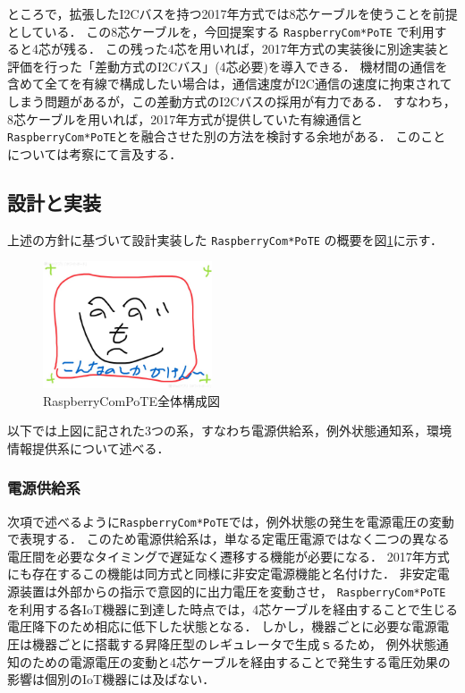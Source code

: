 ところで，拡張したI2Cバスを持つ2017年方式では8芯ケーブルを使うことを前提としている．
この8芯ケーブルを，今回提案する {\tt Raspberry\-Com*PoTE} で利用すると4芯が残る．
この残った4芯を用いれば，2017年方式の実装後に別途実装と評価を行った「差動方式のI2Cバス」(4芯必要)を導入できる．
機材間の通信を含めて全てを有線で構成したい場合は，通信速度がI2C通信の速度に拘束されてしまう問題があるが，この差動方式のI2Cバスの採用が有力である．
すなわち，8芯ケーブルを用いれば，2017年方式が提供していた有線通信と {\tt Raspberry\-Com*PoTE}とを融合させた別の方法を検討する余地がある．
このことについては考察にて言及する．



\subsection{設計と実装}

上述の方針に基づいて設計実装した {\tt Raspberry\-Com*PoTE} の概要を図\ref{RaspberryComPoTE}に示す．

\begin{figure}[H]
\centering
\includegraphics[width=5cm]{figspics/henoheno.jpeg}
\caption{{RaspberryComPoTE}全体構成図}
\label{RaspberryComPoTE}
\end{figure}


以下では上図に記された3つの系，すなわち電源供給系，例外状態通知系，環境情報提供系について述べる．


\subsubsection{電源供給系}

次項で述べるように{\tt Raspberry\-Com*PoTE}では，例外状態の発生を電源電圧の変動で表現する．
このため電源供給系は，単なる定電圧電源ではなく二つの異なる電圧間を必要なタイミングで遅延なく遷移する機能が必要になる．
2017年方式にも存在するこの機能は同方式と同様に非安定電源機能と名付けた．
非安定電源装置は外部からの指示で意図的に出力電圧を変動させ，
{\tt Raspberry\-Com*PoTE}を利用する各IoT機器に到達した時点では，4芯ケーブルを経由することで生じる電圧降下のため相応に低下した状態となる．
しかし，機器ごとに必要な電源電圧は機器ごとに搭載する昇降圧型のレギュレータで生成ｓるため，
例外状態通知のための電源電圧の変動と4芯ケーブルを経由することで発生する電圧効果の影響は個別のIoT機器には及ばない．

